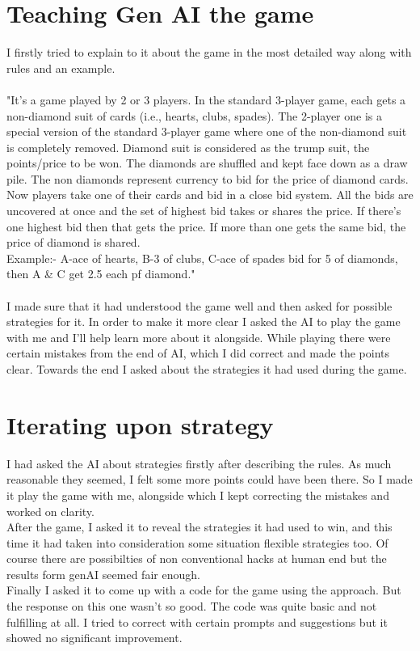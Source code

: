 \documentclass{article}
\begin{document}
\section{Teaching Gen AI the game}
I firstly tried to explain to it about the game in the most detailed way along with rules and an example.\\
\\
"It's a game played by 2 or 3 players. In the standard 3-player game, each gets a non-diamond suit of cards (i.e., hearts, clubs, spades). The 2-player one is a special version of the standard 3-player game where one of the non-diamond suit is completely removed. Diamond suit is considered as the trump suit, the points/price to be won. The diamonds are shuffled and kept face down as a draw pile. The non diamonds represent currency to bid for the price of diamond cards. Now players take one of their cards and bid in a close bid system. All the bids are uncovered at once and the set of highest bid takes or shares the price. If there's one highest bid then that gets the price. If more than one gets the same bid, the price of diamond is shared.\\
Example:- 
A-ace of hearts, B-3 of clubs, C-ace of spades bid for 5 of diamonds, then A \& C get 2.5 each pf diamond."\\
\\
I made sure that it had understood the game well and then asked for possible strategies for it. In order to make it more clear I asked the AI to play the game with me and I'll help learn more about it alongside.
While playing there were certain mistakes from the end of AI, which I did correct and made the points clear. Towards the end I asked about the strategies it had used during the game.

\section{Iterating upon strategy}

I had asked the AI about strategies firstly after describing the rules. As much reasonable they seemed, I felt some more points could have been there. So I made it play the game with me, alongside which I kept correcting the mistakes and worked on clarity. \\
After the game, I asked it to reveal the strategies it had used to win, and this time it had taken into consideration some situation flexible strategies too. Of course there are possibilties of non conventional hacks at human end but the results form genAI seemed fair enough.\\
Finally I asked it to come up with a code for the game using the approach. But the response on this one wasn't so good. The code was quite basic and not fulfilling at all. I tried to correct with certain prompts and suggestions but it showed no significant improvement.
\end{document}
